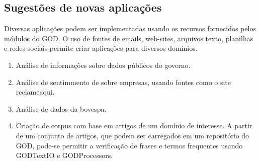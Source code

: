\subsection{Sugestões de novas aplicações}

Diversas aplicações podem ser implementadas usando os recursos fornecidos pelos módulos do GOD. O uso de fontes de emails, web-sites, arquivos texto, planilhas e redes sociais permite criar aplicações para diversos domínios.

\begin{enumerate}
\item Análise de informações sobre dados públicos do governo.
\item Análise de sentimmento de sobre empresas, usando fontes como o site reclameaqui.
\item Análise de dados da bovespa.
\item Criação de corpus com base em artigos de um domínio de interesse. A partir de um conjunto de artigos, que podem ser carregados em um repositório do GOD, pode-se permitir a verificação de frases e termos frequentes usando GODTextIO e GODProcessors.
\end{enumerate}
